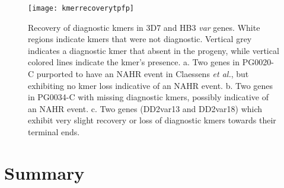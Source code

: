 \begin{landscape}
\begin{figure}[h!]
  \centering
    \texttt{[image: kmerrecoverytpfp]}
  \caption{Recovery of diagnostic kmers in 3D7 and HB3 \textit{var} genes.  White regions indicate kmers that were not diagnostic.  Vertical grey indicates a diagnostic kmer that absent in the progeny, while vertical colored lines indicate the kmer's presence.  a. Two genes in PG0020-C purported to have an NAHR event in Claessens \textit{et al.}, but exhibiting no kmer loss indicative of an NAHR event.  b. Two genes in PG0034-C with missing diagnostic kmers, possibly indicative of an NAHR event.  c. Two genes (DD2var13 and DD2var18) which exhibit very slight recovery or loss of diagnostic kmers towards their terminal ends.}
  \label{fig:kmerrecoverytpfp}
\end{figure}
\end{landscape}

\section{Summary}


